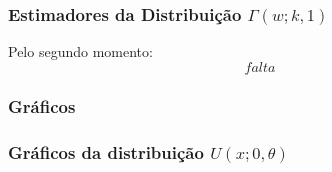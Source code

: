 \begin{frame}
\frametitle{Estimadores da Distribuição $\Gamma(w;k,1)$}
Pelo segundo momento:
\begin{equation}
\label{eq:G_m_p3}
falta
\end{equation}

\end{frame}


\subsubsection{Gráficos}
\begin{frame}
\frametitle{Gráficos da distribuição $U(x; 0,\theta)$}

\end{frame}




